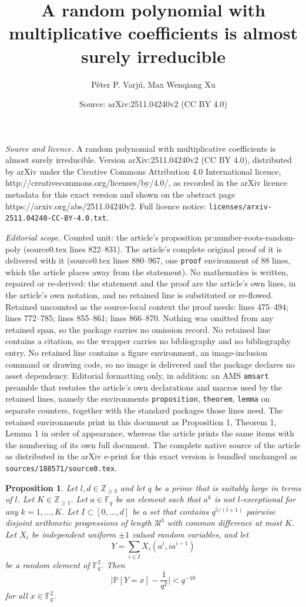 \documentclass[10pt,a4paper]{amsart}
\title{A random polynomial with multiplicative coefficients is almost surely irreducible}
\author{P\'eter P. Varj\'u, Max Wenqiang Xu}
\date{Source: arXiv:2511.04240v2 (CC BY 4.0)}
\newtheorem{proposition}{Proposition}
\def\F{\mathbb F}
\def\P{\mathbb P}
\def\Z{\mathbb Z}
\begin{document}
\maketitle

\noindent\emph{Source and licence.} A random polynomial with multiplicative coefficients is almost surely irreducible. Version arXiv:2511.04240v2 (CC BY 4.0), distributed by arXiv under the Creative Commons Attribution 4.0 International licence, http://creativecommons.org/licenses/by/4.0/, as recorded in the arXiv licence metadata for this exact version and shown on the abstract page https://arxiv.org/abs/2511.04240v2. Full licence notice: \texttt{licenses/arxiv-2511.04240-CC-BY-4.0.txt}.\par\smallskip

\noindent\textit{Editorial scope.} Counted unit: the article's proposition pr:number-roots-random-poly (source0.tex lines 822--831). The article's complete original proof of it is delivered with it (source0.tex lines 880--967, one \texttt{proof} environment of 88 lines, which the article places away from the statement). No mathematics is written, repaired or re-derived: the statement and the proof are the article's own lines, in the article's own notation, and no retained line is substituted or re-flowed.  Retained uncounted as the source-local context the proof needs: lines 475--494; lines 772--785; lines 855--861; lines 866--870.  Nothing was omitted from any retained span, so the package carries no omission record.  No retained line contains a citation, so the wrapper carries no bibliography and no bibliography entry.  No retained line contains a figure environment, an image-inclusion command or drawing code, so no image is delivered and the package declares no asset dependency.  Editorial formatting only, in addition: an AMS \texttt{amsart} preamble that restates the article's own declarations and macros used by the retained lines, namely the environments \texttt{proposition}, \texttt{theorem}, \texttt{lemma} on separate counters, together with the standard packages those lines need.  The retained environments print in this document as Proposition 1, Theorem 1, Lemma 1 in order of appearance, whereas the article prints the same items with the numbering of its own full document.  The complete native source of the article as distributed in the arXiv e-print for this exact version is bundled unchanged as \texttt{sources/188571/source0.tex}.
\begin{proposition}\label{pr:unexceptional}
Let $l,d\in\Z_{\ge 3}$ and let $q$ be a prime that is suitably large in
terms of $l$.
Let $K\in\Z_{\ge1}$.
Let $a\in\F_q$ be an element such that $a^k$
is not $l$-exceptional for any $k=1,\ldots,K$.
Let $I\subset [0,\ldots,d]$ be a set that contains $q^{5/(l+1)}$ pairwise disjoint
arithmetic progressions of length $3l^3$ with common difference at most $K$.
Let $X_i$ be independent uniform $\pm1$ valued random variables, and
let
\[
Y=\sum_{i\in I}X_i(a^i,ia^{i-1})
\]
be a random element of $\F_q^2$.
Then
\[
\Big|\P[Y=x]-\frac{1}{q^2}\Big|< q^{-10}
\]
for all $x\in\F_q^2$.
\end{proposition}
\end{document}
